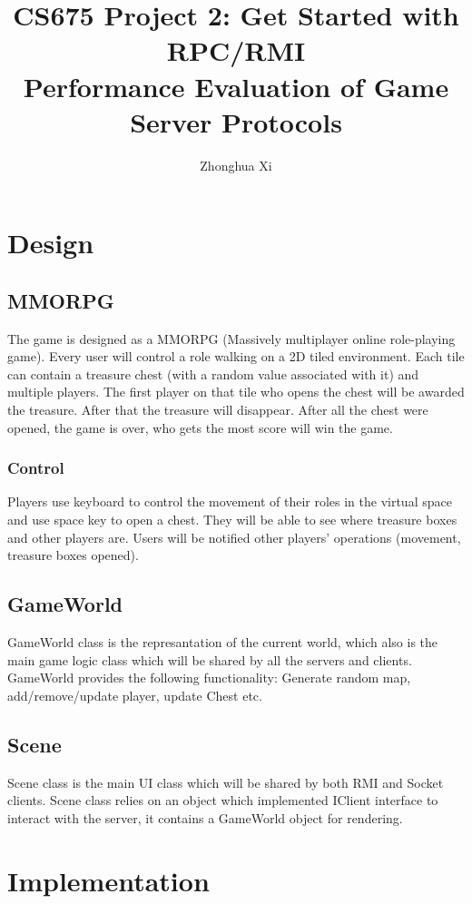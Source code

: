 \documentclass[11pt, oneside]{article}   	%
\title{CS675 Project 2: Get Started with RPC/RMI \\
Performance Evaluation of Game Server Protocols}
\author{Zhonghua Xi}
\begin{document}
\maketitle

\section{Design}
\subsection{MMORPG}
The game is designed as a MMORPG (Massively multiplayer online role-playing game). Every user will control a role walking on a 2D tiled environment. Each tile can contain a treasure chest (with a random value associated with it) and multiple players. The first player on that tile who opens the chest will be awarded the treasure. After that the treasure will disappear. After all the chest were opened, the game is over, who gets the most score will win the game.

\subsubsection{Control}
Players use keyboard to control the movement of their roles in the virtual space and use space key to open a chest. They will be able to see where treasure boxes and other players are. Users will be notified other players' operations (movement, treasure boxes opened).

\subsection{GameWorld}
GameWorld class is the represantation of the current world, which also is the main game logic class which will be shared by all the servers and clients. GameWorld provides the following functionality: Generate random map, add/remove/update player, update Chest etc.

\subsection{Scene}
Scene class is the main UI class which will be shared by both RMI and Socket clients. Scene class relies on an object which implemented IClient interface to interact with the server, it contains a GameWorld object for rendering.

\section{Implementation}
\end{document}
